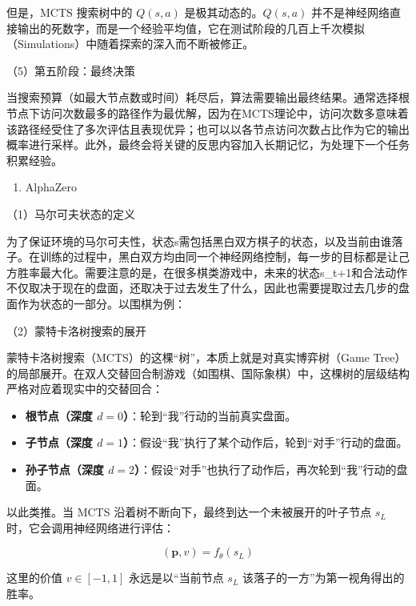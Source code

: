 但是，MCTS 搜索树中的 \(Q(s,a)\) 是极其动态的。\(Q(s,a)\) 并不是神经网络直接输出的死数字，而是一个经验平均值，它在测试阶段的几百上千次模拟（Simulations）中随着探索的深入而不断被修正。

（5）第五阶段：最终决策

当搜索预算（如最大节点数或时间）耗尽后，算法需要输出最终结果。通常选择根节点下访问次数最多的路径作为最优解，因为在MCTS理论中，访问次数多意味着该路径经受住了多次评估且表现优异；也可以以各节点访问次数占比作为它的输出概率进行采样。此外，最终会将关键的反思内容加入长期记忆，为处理下一个任务积累经验。

\begin{enumerate}
\def\labelenumi{\arabic{enumi}.}
\setcounter{enumi}{1}
\tightlist
\item
  AlphaZero
\end{enumerate}

（1）马尔可夫状态的定义

为了保证环境的马尔可夫性，状态s需包括黑白双方棋子的状态，以及当前由谁落子。在训练的过程中，黑白双方均由同一个神经网络控制，每一步的目标都是让己方胜率最大化。需要注意的是，在很多棋类游戏中，未来的状态s\_t+1和合法动作不仅取决于现在的盘面，还取决于过去发生了什么，因此也需要提取过去几步的盘面作为状态的一部分。以围棋为例：

（2）蒙特卡洛树搜索的展开

蒙特卡洛树搜索（MCTS）的这棵``树''，本质上就是对真实博弈树（Game Tree）的局部展开。在双人交替回合制游戏（如围棋、国际象棋）中，这棵树的层级结构严格对应着现实中的交替回合：

\begin{itemize}
\tightlist
\item
  \textbf{根节点（深度 \(d=0\)）}：轮到``我''行动的当前真实盘面。
\item
  \textbf{子节点（深度 \(d=1\)）}：假设``我''执行了某个动作后，轮到``对手''行动的盘面。
\item
  \textbf{孙子节点（深度 \(d=2\)）}：假设``对手''也执行了动作后，再次轮到``我''行动的盘面。
\end{itemize}

以此类推。当 MCTS 沿着树不断向下，最终到达一个未被展开的叶子节点 \(s_L\) 时，它会调用神经网络进行评估：

\[
(\mathbf{p},v)=f_\theta(s_L)
\]

这里的价值 \(v\in[-1,1]\) 永远是以``当前节点 \(s_L\) 该落子的一方''为第一视角得出的胜率。

